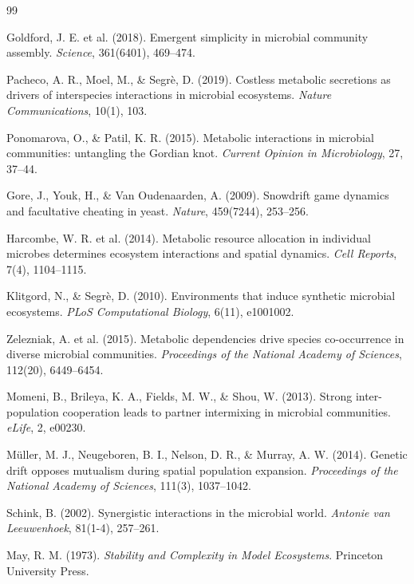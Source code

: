 \documentclass[11pt]{article}
\begin{document}
\begin{thebibliography}{99}

Goldford, J. E. et al. (2018). Emergent simplicity in microbial community assembly. \textit{Science}, 361(6401), 469--474.

Pacheco, A. R., Moel, M., \& Segrè, D. (2019). Costless metabolic secretions as drivers of interspecies interactions in microbial ecosystems. \textit{Nature Communications}, 10(1), 103.

Ponomarova, O., \& Patil, K. R. (2015). Metabolic interactions in microbial communities: untangling the Gordian knot. \textit{Current Opinion in Microbiology}, 27, 37--44.

Gore, J., Youk, H., \& Van Oudenaarden, A. (2009). Snowdrift game dynamics and facultative cheating in yeast. \textit{Nature}, 459(7244), 253--256.

Harcombe, W. R. et al. (2014). Metabolic resource allocation in individual microbes determines ecosystem interactions and spatial dynamics. \textit{Cell Reports}, 7(4), 1104--1115.

Klitgord, N., \& Segrè, D. (2010). Environments that induce synthetic microbial ecosystems. \textit{PLoS Computational Biology}, 6(11), e1001002.

Zelezniak, A. et al. (2015). Metabolic dependencies drive species co-occurrence in diverse microbial communities. \textit{Proceedings of the National Academy of Sciences}, 112(20), 6449--6454.

Momeni, B., Brileya, K. A., Fields, M. W., \& Shou, W. (2013). Strong inter-population cooperation leads to partner intermixing in microbial communities. \textit{eLife}, 2, e00230.

Müller, M. J., Neugeboren, B. I., Nelson, D. R., \& Murray, A. W. (2014). Genetic drift opposes mutualism during spatial population expansion. \textit{Proceedings of the National Academy of Sciences}, 111(3), 1037--1042.

Schink, B. (2002). Synergistic interactions in the microbial world. \textit{Antonie van Leeuwenhoek}, 81(1-4), 257--261.

May, R. M. (1973). \textit{Stability and Complexity in Model Ecosystems}. Princeton University Press.


\end{thebibliography}
\end{document}
